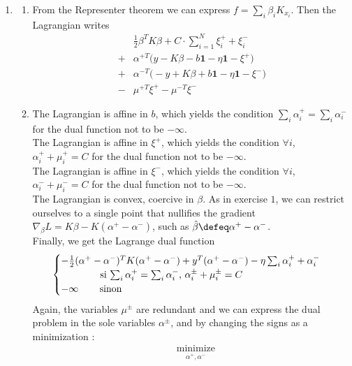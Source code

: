 \documentclass[french]{article}
\begin{document}
\begin{enumerate}
\item
    \begin{enumerate}
    \item From the Representer theorem we can express $f = \sum_i \beta_i K_{x_i}$. Then the Lagrangian writes
    \begin{align*}
    &\frac{1}{2} \beta^T K \beta + C \cdot \sum_{i=1}^N \xi^+_i + \xi^-_i \\
    +& \alpha^{+T} \big ( y - K\beta - b \mathbf{1} - \eta \mathbf{1} - \xi^+ \big ) \\
    +& \alpha^{-T} \big ( -y + K\beta + b\mathbf{1} - \eta \mathbf{1} - \xi^- \big ) \\
    -& \mu^{+T} \xi^+ - \mu^{-T} \xi^-
    \end{align*}
    \item
    The Lagrangian is affine in $b$, which yields the condition $\sum_i \alpha^+_i = \sum_i \alpha^-_i $ for the dual function not to be $-\infty$.\\
    The Lagrangian is affine in $\xi^+$, which yields the condition $\forall i$, $ \alpha^+_i + \mu_i^+= C $ for the dual function not to be $-\infty$.\\
    The Lagrangian is affine in $\xi^-$, which yields the condition $\forall i$, $ \alpha^-_i + \mu_i^-= C $ for the dual function not to be $-\infty$.\\
    The Lagrangian is convex, coercive in $\beta$. As in exercise $1$, we can restrict ourselves to a single point that nullifies the gradient $\nabla_\beta L = K\beta - K (\alpha^+ - \alpha^-)$, such as $\hat{\beta} \defeq \alpha^+ - \alpha^-$.\\
    Finally, we get the Lagrange dual function
    \[ \begin{cases}
        - \frac{1}{2}(\alpha^+ - \alpha^-)^T K (\alpha^+ - \alpha^-) + y^T (\alpha^+ - \alpha^-) - \eta \sum_i \alpha_i^+ + \alpha_i^- \\ \qquad \qquad \textrm{si $\sum_i \alpha^+_i = \sum_i \alpha^-_i $, $ \alpha^\pm_i + \mu_i^\pm= C $} \\
        - \infty \, \qquad \textrm{sinon}
    \end{cases} \]
    Again, the variables $\mu^\pm$ are redundant and we can express the dual problem in the sole variables $\alpha^\pm$, and by changing the signs as a minimization :
    \begin{equation*}
    \begin{aligned}
    & \underset{\alpha^+, \alpha^-}{\text{minimize}}

\end{aligned}
\end{equation*}
\end{enumerate}
\end{enumerate}
\end{document}
